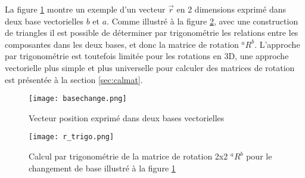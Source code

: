La figure \ref{fig:basechange2d} montre un exemple d'un vecteur $\vec{r}$ en 2 dimensions exprimé dans deux base vectorielles $b$ et $a$. Comme illustré à la figure \ref{fig:r_trigo}, avec une construction de triangles il est possible de déterminer par trigonométrie les relations entre les composantes dans les deux bases, et donc la matrice de rotation ${}^aR^b$. L'approche par trigonométrie est toutefois limitée pour les rotations en 3D, une approche vectorielle plus simple et plus universelle pour calculer des matrices de rotation est présentée à la section \ref{sec:calmat}.
\begin{figure}[htbp]
	\centering
		\texttt{[image: basechange.png]}
	\caption{Vecteur position exprimé dans deux bases vectorielles}
	\label{fig:basechange2d}
\end{figure}
\begin{figure}[hb]
	\centering
		\texttt{[image: r\_trigo.png]}
	\caption{Calcul par trigonométrie de la matrice de rotation 2x2 ${}^aR^b$ pour le changement de base illustré à la figure \ref{fig:basechange2d}}
	\label{fig:r_trigo}
\end{figure}


